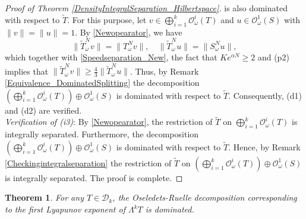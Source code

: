 \documentclass[pdflatex,sn-mathphys-num]{sn-jnl}%
\theoremstyle{thmstyleone}%
\newtheorem{theorem}{Theorem}%
\theoremstyle{thmstyletwo}%
\theoremstyle{thmstylethree}%
\numberwithin{equation}{section}
\begin{document}
\begin{proof}[Proof of Theorem \ref{DensityIntegralSeparation_Hilbertspace}]
is also dominated with respect to $\widetilde T$. For this purpose, let $v\in \bigoplus_{i=1}^k\mathcal O^i_{\omega}(T)$  and $u\in \mathcal O_{\omega}^1(S)$ with $\|v\|=\|u\|=1$. By \eqref{Newopearator}, we have 
\[
\|{\widetilde T}^N_{\omega}v\|=\|T^N_{\omega}v\|,\quad \|{\widetilde T}^N_{\omega}u\|=\|S^N_{\omega}u\|, 
\]
which together with  \eqref{Speedseparation_New}, the fact that $Ke^{\alpha N}\geq 2$ and (p2) implies that 
$
\|{\widetilde T}^N_{\omega}v\|
\geq \frac{4}{3} \|{\widetilde T}^N_{\omega}u\|$. Thus, by Remark \ref{Equivalence_DominatedSplitting} the decomposition $ \left(\bigoplus_{i=1}^k\mathcal O^i_{\omega}(T)\right) \oplus \mathcal O_{\omega}^1(S)$
is dominated with respect to $\widetilde T$. Consequently, (d1) and (d2) are verified.\\ 

\noindent 
\emph{Verification of (i3)}: By \eqref{Newopearator}, the restriction of $\widetilde T$ on $\bigoplus_{i=1}^k\mathcal O^i_{\omega}(T)$ is integrally separated. Furthermore,  the decomposition $ \left(\bigoplus_{i=1}^k\mathcal O^i_{\omega}(T)\right) \oplus \mathcal O_{\omega}^1(S)$
is dominated with respect to $\widetilde T$. Hence, by Remark \ref{Checkingintegralseparation} the restriction of $\widetilde T$ on  $ \left(\bigoplus_{i=1}^k\mathcal O^i_{\omega}(T)\right) \oplus \mathcal O_{\omega}^1(S)$ is integrally separated. The proof is complete.  
\end{proof}
%
%
\begin{theorem}\label{Integralseparation_Exteriorpower}
For any $T\in \mathcal D_k$, the Oseledets-Ruelle decomposition corresponding to the first Lyapunov exponent of $\Lambda^k T$ is dominated. 
\end{theorem}
%
%
%
\end{document}
